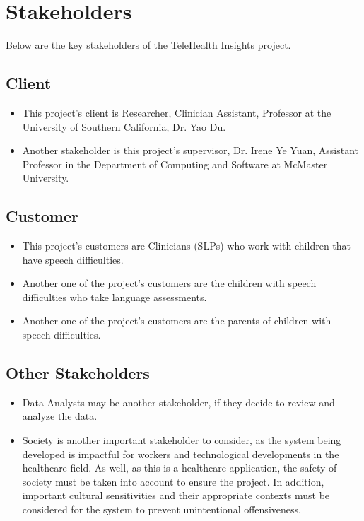 \documentclass[12pt]{article}
\begin{document}
\newpage

\section{Stakeholders}
\hspace{2em}Below are the key stakeholders of the TeleHealth Insights project.
\subsection{Client}
  \begin{itemize}
    \item This project's client is Researcher, Clinician Assistant, Professor at the University of Southern California, Dr. Yao Du.
    \item Another stakeholder is this project's supervisor, Dr. Irene Ye Yuan, Assistant Professor in the Department of Computing and Software at McMaster University.
  \end{itemize}
  \subsection{Customer}
  \begin{itemize}
    \item This project's customers are Clinicians (SLPs) who work with children that have speech difficulties.
    \item Another one of the project's customers are the children with speech difficulties who take language assessments.
    \item Another one of the project's customers are the parents of children with speech difficulties.
  \end{itemize}
  \subsection{Other Stakeholders}
  \begin{itemize}
    \item Data Analysts may be another stakeholder, if they decide to review and analyze the data.
    \item Society is another important stakeholder to consider, as the system being developed is impactful for workers and technological developments in the healthcare field.
          As well, as this is a healthcare application, the safety of society must be taken into account to ensure the project.
          In addition, important cultural sensitivities and their appropriate contexts must be considered for the system to prevent unintentional offensiveness.
  \end{itemize}
\end{document}
